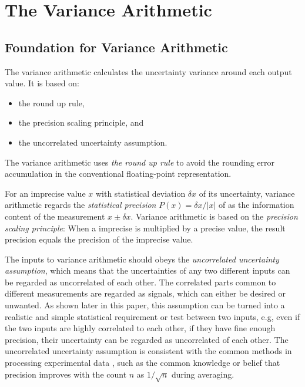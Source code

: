 \documentclass[twoside]{article}
\numberwithin{equation}{section}
\begin{document}
\clearpage
\section{The Variance Arithmetic}
\label{sec: Variance arithmetic}


\subsection{Foundation for Variance Arithmetic}

The variance arithmetic calculates the uncertainty variance around each output value.
It is based on:
\begin{itemize}
\item the round up rule,

\item the precision scaling principle, and

\item the uncorrelated uncertainty assumption.
\end{itemize}  

The variance arithmetic uses \emph{the round up rule} to avoid the rounding error accumulation in the conventional floating-point representation.

For an imprecise value $x$ with statistical deviation $\delta x$ of its uncertainty, variance arithmetic regards the \emph{statistical precision} $P(x) = \delta x/|x|$ of as the information content of the measurement $x \pm \delta x$.
Variance arithmetic is based on the \emph{precision scaling principle}: When a imprecise is multiplied by a precise value, the result precision equals the precision of the imprecise value.

The inputs to variance arithmetic should obeys the \emph{uncorrelated uncertainty assumption}, which means that the uncertainties of any two different inputs can be regarded as uncorrelated of each other. 
The correlated parts common to different measurements are regarded as signals, which can either be desired or unwanted.
As shown later in this paper, this assumption can be turned into a realistic and simple statistical requirement or test between two inputs, e.g, even if the two inputs are highly correlated to each other, if they have fine enough precision, their uncertainty can be regarded as uncorrelated of each other.
The uncorrelated uncertainty assumption is consistent with the common methods in processing experimental data \cite{Statistical_Methods}\cite{Precisions_Physical_Measurements}, such as the common knowledge or belief that precision improves with the count $n$ as $1 / \sqrt{n}$ during averaging.
\end{document}
